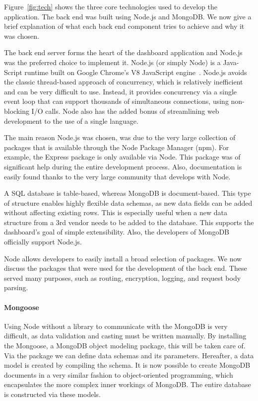         Figure~\ref{fig:tech} shows the three core technologies used to develop the application. The back end was built using Node.js and MongoDB\@. We now give a brief explanation of what each back end component tries to achieve and why it was chosen.


            The back end server forms the heart of the dashboard application and Node.js was the preferred choice to implement it. Node.js (or simply Node) is a Java-Script runtime built on Google Chrome's V8 JavaScript engine~\cite{NodeJS}. Node.js avoids the classic thread-based approach of concurrency, which is relatively inefficient and can be very difficult to use. Instead, it provides concurrency via a single event loop that can support thousands of simultaneous connections, using non-blocking I/O calls. Node also has the added bonus of streamlining web development to the use of a single language.
            
            The main reason Node.js was chosen, was due to the very large collection of packages that is available through the Node Package Manager (npm). For example, the Express package is only available via Node. This package was of significant help during the entire development process. Also, documentation is easily found thanks to the very large community that develops with Node.

            
            A SQL database is table-based, whereas MongoDB is document-based. This type of structure enables highly flexible data schemas, as new data fields can be added without affecting existing rows. This is especially useful when a new data structure from a 3rd vendor needs to be added to the database. This supports the dashboard's goal of simple extensibility. Also, the developers of MongoDB officially support Node.js.


            Node allows developers to easily install a broad selection of packages. We now discuss the packages that were used for the development of the back end. These served many purposes, such as routing, encryption, logging, and request body parsing. 

                \paragraph{Mongoose} Using Node without a library to communicate with the MongoDB is very difficult, as data validation and casting must be written manually. By installing the Mongoose, a MongoDB object modeling package, this will be taken care of. Via the package we can define data schemas and its parameters. Hereafter, a data model is created by compiling the schema. It is now possible to create MongoDB documents in a very similar fashion to object-oriented programming, which encapsulates the more complex inner workings of MongoDB\@. The entire database is constructed via these models.

